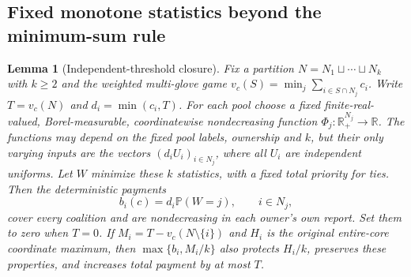 \documentclass[11pt]{article}
\newtheorem{lemma}[theorem]{Lemma}
\theoremstyle{definition}\newtheorem{definition}[theorem]{Definition}
\theoremstyle{remark}\newtheorem{remark}[theorem]{Remark}
\newcommand{\R}{\mathbb R}
\newcommand{\Prob}{\mathbb P}
\begin{document}
\subsection{Fixed monotone statistics beyond the minimum-sum rule}
\begin{lemma}[Independent-threshold closure]\label{hist:threshold-class}
Fix a partition $N=N_1\sqcup\cdots\sqcup N_k$ with $k\ge2$ and the
weighted multi-glove game
$v_c(S)=\min_j\sum_{i\in S\cap N_j}c_i$. Write $T=v_c(N)$ and
$d_i=\min(c_i,T)$. For each pool choose a fixed finite-real-valued,
Borel-measurable, coordinatewise nondecreasing function
$\Phi_j:\R_+^{N_j}\to\R$. The functions may depend on the fixed pool
labels, ownership and $k$, but their only varying inputs are the vectors
$(d_iU_i)_{i\in N_j}$, where all $U_i$ are independent uniforms.
Let $W$ minimize these $k$ statistics, with a fixed total priority for ties.
Then the deterministic payments
\[
 b_i(c)=d_i\Prob(W=j),\qquad i\in N_j,
\]
cover every coalition and are nondecreasing in each owner's own report.
Set them to zero when $T=0$. If $M_i=T-v_c(N\setminus\{i\})$ and
$H_i$ is the original entire-core coordinate maximum, then
$\max\{b_i,M_i/k\}$ also protects $H_i/k$, preserves these properties,
and increases total payment by at most $T$.
\end{lemma}
\end{document}
